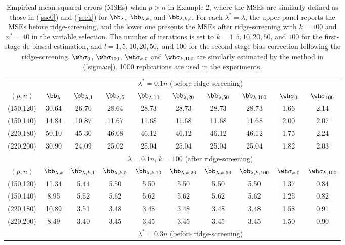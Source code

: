 {{\begin{table}[htp]\scriptsize
\caption{Empirical mean squared  errors (MSEs) when $p> n$ in Example 2, where the MSEs are similarly defined as those in (\ref{sse0}) and (\ref{ssek}) for $\bb_{\lambda}$, $\bb_{\lambda,k}$, and $\bb_{\lambda,k,l}$. For each $\lambda^*=\lambda$, the upper panel reports the MSEs before ridge-screening, and the lower one presents the MSEs after ridge-screening with $k=100$ and $n^*=40$ in the variable selection. The number of iterations is set to $k=1,5,10,20,50$, and $100$ for the first-stage de-biased estimation, and  $l=1,5,10,20,50,$ and $100$ for the second-stage bias-correction following the ridge-screening.  $\wh\sigma_0$, $\wh\sigma_{100}$, $\wh\sigma_{k,0}$ and $\wh\sigma_{k,100}$ are similarly estimated by the method in (\ref{sigma:e}). 1000 replications are used in the experiments.} 
          \label{Table-a3}
{\begin{center}
\begin{tabular}{cccccccccc}
\toprule
&\multicolumn{9}{c}{$\lambda^*=0.1n$ (before ridge-screening)}\\
\cline{2-10}
$(p,n)$&$\bb_{\lambda}$&$\bb_{\lambda,1}$&$\bb_{\lambda,5}$&$\bb_{\lambda,10}$&$\bb_{\lambda,20}$&$\bb_{\lambda,50}$&$\bb_{\lambda,100}$&$\wh\sigma_0$&$\wh\sigma_{100}$\\
\hline
(150,120)&30.64&26.70&28.64&28.73&28.73&28.73&28.73&1.66&2.14\\
(150,140)&14.84&10.87&11.67&11.68&11.68&11.68&11.68&2.00&2.07\\
(220,180)&50.10&45.30&46.08&46.12&46.12&46.12&46.12&1.75&2.24\\
(220,200)&30.90&24.09&25.02&25.04&25.04&25.04&25.04&1.82&2.03\\
\midrule
&\multicolumn{9}{c}{$\lambda=0.1n$, $k=100$ (after ridge-screening)}\\
\cline{2-10}
$(p,n)$&$\bb_{\lambda,k}$&$\bb_{\lambda,k,1}$&$\bb_{\lambda,k,5}$&$\bb_{\lambda,k,10}$&$\bb_{\lambda,k,20}$&$\bb_{\lambda,k,50}$&$\bb_{\lambda,k,100}$&$\wh\sigma_{k,0}$&$\wh\sigma_{k,100}$\\
\hline
(150,120)&11.34&5.44&5.50&5.50&5.50&5.50&5.50&1.37&0.84\\
(150,140)&8.95&5.52&5.62&5.62&5.62&5.62&5.62&1.25&0.82\\
(220,180)&10.89&3.51&3.48&3.48&3.48&3.48&3.48&1.58&0.91\\
(220,200)&8.49&3.40&3.45&3.45&3.45&3.45&3.45&1.50&0.90\\
\midrule
\midrule
&\multicolumn{9}{c}{$\lambda^*=0.3n$ (before ridge-screening)}\\

\end{tabular}
\end{center}}
\end{table}}}
